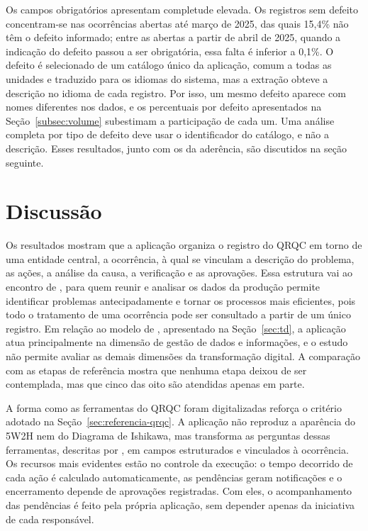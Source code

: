 Os campos obrigatórios apresentam completude elevada. Os registros sem defeito concentram-se nas ocorrências abertas até março de 2025, das quais 15,4\% não têm o defeito informado; entre as abertas a partir de abril de 2025, quando a indicação do defeito passou a ser obrigatória, essa falta é inferior a 0,1\%. O defeito é selecionado de um catálogo único da aplicação, comum a todas as unidades e traduzido para os idiomas do sistema, mas a extração obteve a descrição no idioma de cada registro. Por isso, um mesmo defeito aparece com nomes diferentes nos dados, e os percentuais por defeito apresentados na Seção~\ref{subsec:volume} subestimam a participação de cada um. Uma análise completa por tipo de defeito deve usar o identificador do catálogo, e não a descrição. Esses resultados, junto com os da aderência, são discutidos na seção seguinte.

\section{Discussão}
\label{sec:discussao}

Os resultados mostram que a aplicação organiza o registro do QRQC em torno de uma entidade central, a ocorrência, à qual se vinculam a descrição do problema, as ações, a análise da causa, a verificação e as aprovações. Essa estrutura vai ao encontro de , para quem reunir e analisar os dados da produção permite identificar problemas antecipadamente e tornar os processos mais eficientes, pois todo o tratamento de uma ocorrência pode ser consultado a partir de um único registro. Em relação ao modelo de , apresentado na Seção~\ref{sec:td}, a aplicação atua principalmente na dimensão de gestão de dados e informações, e o estudo não permite avaliar as demais dimensões da transformação digital. A comparação com as etapas de referência mostra que nenhuma etapa deixou de ser contemplada, mas que cinco das oito são atendidas apenas em parte.

A forma como as ferramentas do QRQC foram digitalizadas reforça o critério adotado na Seção~\ref{sec:referencia-qrqc}. A aplicação não reproduz a aparência do 5W2H nem do Diagrama de Ishikawa, mas transforma as perguntas dessas ferramentas, descritas por , em campos estruturados e vinculados à ocorrência. Os recursos mais evidentes estão no controle da execução: o tempo decorrido de cada ação é calculado automaticamente, as pendências geram notificações e o encerramento depende de aprovações registradas. Com eles, o acompanhamento das pendências é feito pela própria aplicação, sem depender apenas da iniciativa de cada responsável.


